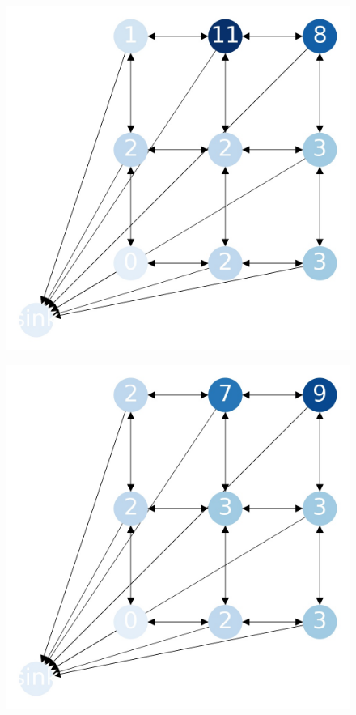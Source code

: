 \documentclass{beamer}
\begin{document}
\begin{frame}
  \begin{figure}[h!]
    \centering
      \includegraphics[scale=0.25]{sandpile_18}
  \end{figure}
\end{frame}


\begin{frame}
  \begin{figure}[h!]
    \centering
      \includegraphics[scale=0.25]{sandpile_19}
  \end{figure}
\end{frame}
\end{document}
